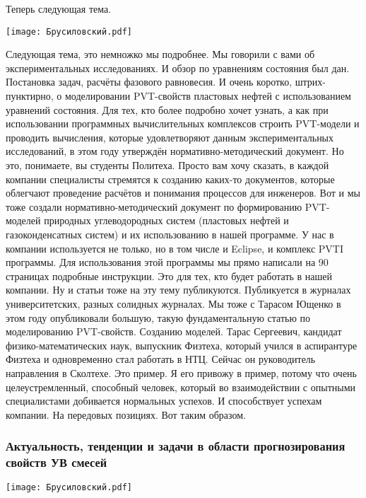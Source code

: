 \documentclass[main.tex]{subfiles}
\begin{document}
Теперь следующая тема.

\begin{center}
\texttt{[image: Брусиловский.pdf]}
\end{center}

Следующая тема, это немножко мы подробнее.
Мы говорили с вами об экспериментальных исследованиях.
И обзор по уравнениям состояния был дан.
Постановка задач, расчёты фазового равновесия.
И очень коротко, штрих-пунктирно, о моделировании PVT-свойств пластовых нефтей с использованием уравнений состояния.
Для тех, кто более подробно хочет узнать, а как при использовании программных вычислительных комплексов строить PVT-модели и проводить вычисления, которые удовлетворяют данным экспериментальных исследований, в этом году утверждён нормативно-методический документ.
Но это, понимаете, вы студенты Политеха.
Просто вам хочу сказать, в каждой компании специалисты стремятся к созданию каких-то документов, которые облегчают проведение расчётов и понимания процессов для инженеров.
Вот и мы тоже создали нормативно-методический документ по формированию PVT-моделей природных углеводородных систем (пластовых нефтей и газоконденсатных систем) и их использованию в нашей программе.
У нас в компании используется не только, но в том числе и Eclipse, и комплекс PVTI программы.
Для использования этой программы мы прямо написали на 90 страницах подробные инструкции.
Это для тех, кто будет работать в нашей компании.
Ну и статьи тоже на эту тему публикуются.
Публикуется в журналах университетских, разных солидных журналах.
Мы тоже с Тарасом Ющенко в этом году опубликовали большую, такую фундаментальную статью по моделированию PVT-свойств.
Созданию моделей.
Тарас Сергеевич, кандидат физико-математических наук, выпускник Физтеха, который учился в аспирантуре Физтеха и одновременно стал работать в НТЦ.
Сейчас он руководитель направления в Сколтехе.
Это пример.
Я его привожу в пример, потому что очень целеустремленный, способный человек, который во взаимодействии с опытными специалистами добивается нормальных успехов.
И способствует успехам компании.
На передовых позициях.
Вот таким образом.

\subsubsection{Актуальность, тенденции и задачи в области прогнозирования свойств УВ смесей}

\begin{center}
\texttt{[image: Брусиловский.pdf]}
\end{center}
\end{document}
